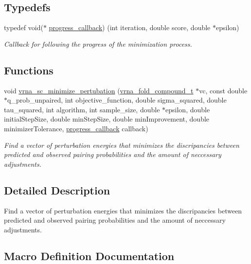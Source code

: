 \subsection*{Typedefs}
\begin{DoxyCompactItemize}
\item 
typedef void($\ast$ \hyperlink{group__perturbation_gaa715397c7afd2d2955c315512a3d571a}{progress\+\_\+callback}) (int iteration, double score, double $\ast$epsilon)
\begin{DoxyCompactList}\small\item\em Callback for following the progress of the minimization process. \end{DoxyCompactList}\end{DoxyCompactItemize}
\subsection*{Functions}
\begin{DoxyCompactItemize}
\item 
void \hyperlink{group__perturbation_gaa124bdc20d88001c38ade590c4bcc3c4}{vrna\+\_\+sc\+\_\+minimize\+\_\+pertubation} (\hyperlink{group__fold__compound_ga1b0cef17fd40466cef5968eaeeff6166}{vrna\+\_\+fold\+\_\+compound\+\_\+t} $\ast$vc, const double $\ast$q\+\_\+prob\+\_\+unpaired, int objective\+\_\+function, double sigma\+\_\+squared, double tau\+\_\+squared, int algorithm, int sample\+\_\+size, double $\ast$epsilon, double initial\+Step\+Size, double min\+Step\+Size, double min\+Improvement, double minimizer\+Tolerance, \hyperlink{group__perturbation_gaa715397c7afd2d2955c315512a3d571a}{progress\+\_\+callback} callback)
\begin{DoxyCompactList}\small\item\em Find a vector of perturbation energies that minimizes the discripancies between predicted and observed pairing probabilities and the amount of neccessary adjustments. \end{DoxyCompactList}\end{DoxyCompactItemize}


\subsection{Detailed Description}
Find a vector of perturbation energies that minimizes the discripancies between predicted and observed pairing probabilities and the amount of neccessary adjustments. 



\subsection{Macro Definition Documentation}
